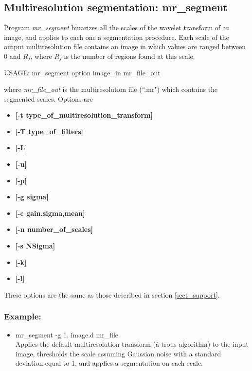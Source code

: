 \subsection{Multiresolution segmentation: mr\_segment}
Program 
{\em mr\_segment} binarizes all the scales of the wavelet 
transform of an image, and applies tp each one 
a segmentation procedure. 
Each scale of the output multiresolution file contains 
an image in which values are ranged between 0 and $R_j$,
where $R_j$ is the number of regions found at this scale.
{\bf
\begin{center}
 USAGE: mr\_segment option image\_in mr\_file\_out
\end{center}}
where {\em mr\_file\_out} is the multiresolution file (``.mr")
which contains the segmented scales. Options are 
\begin{itemize}
\baselineskip=0.4truecm
\itemsep=0.1truecm
\item {\bf [-t type\_of\_multiresolution\_transform]} 
\item {\bf [-T type\_of\_filters]}  
\item {\bf [-L]} 
\item {\bf [-u]} 
\item {\bf [-p]} 
\item {\bf [-g sigma]} 
\item {\bf [-c gain,sigma,mean]} 
\item {\bf [-n number\_of\_scales]} 
\item {\bf [-s NSigma]} 
\item {\bf [-k]} 
\item {\bf [-l]}
\end{itemize}
These options are the same as those described in 
section \ref{sect_support}.
\subsubsection*{Example:}
\begin{itemize}
\item mr\_segment -g 1. image.d  mr\_file\\
Applies the default multiresolution transform (\`a trous algorithm)
to the input image, thresholds the scale assuming Gaussian noise
with a standard deviation equal to 1, and applies a segmentation
on each scale.
\end{itemize}

